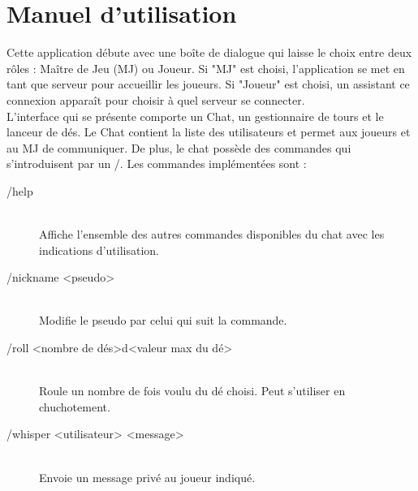\section{Manuel d'utilisation}

Cette application débute avec une boîte de dialogue qui laisse le choix entre deux rôles : Maître de Jeu (MJ) ou Joueur. Si "MJ" est choisi, l'application se met en tant que serveur pour accueillir les joueurs. Si "Joueur" est choisi, un assistant ce connexion apparaît pour choisir à quel serveur se connecter. \\

L'interface qui se présente comporte un Chat, un gestionnaire de tours et le lanceur de dés. Le Chat contient la liste des utilisateurs et permet aux joueurs et au MJ de communiquer. De plus, le chat possède des commandes qui s'introduisent par un /. Les commandes implémentées sont :

\begin{description}
	\item[/help] \hfill \\
		Affiche l'ensemble des autres commandes disponibles du chat avec les indications d'utilisation.
	\item[/nickname <pseudo>] \hfill \\
		Modifie le pseudo par celui qui suit la commande.
	\item[/roll <nombre de dés>d<valeur max du dé>] \hfill \\
		Roule un nombre de fois voulu du dé choisi. Peut s'utiliser en chuchotement.
	\item[/whisper <utilisateur> <message>] \hfill \\
		Envoie un message privé au joueur indiqué.
\end{description}


